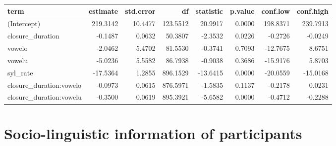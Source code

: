 \documentclass[preprint]{JASAnew}
\begin{document}
\begin{tabular}{lrrrrrrr}
\toprule
term & estimate & std.error & df & statistic & p.value & conf.low & conf.high\\
\midrule
(Intercept) & 219.3142 & 10.4477 & 123.5512 & 20.9917 & 0.0000 & 198.8371 & 239.7913\\
closure\_duration & -0.1487 & 0.0632 & 50.3807 & -2.3532 & 0.0226 & -0.2726 & -0.0249\\
vowelo & -2.0462 & 5.4702 & 81.5530 & -0.3741 & 0.7093 & -12.7675 & 8.6751\\
vowelu & -5.0236 & 5.5582 & 86.7938 & -0.9038 & 0.3686 & -15.9176 & 5.8703\\
syl\_rate & -17.5364 & 1.2855 & 896.1529 & -13.6415 & 0.0000 & -20.0559 & -15.0168\\
\addlinespace
closure\_duration:vowelo & -0.0973 & 0.0615 & 876.5971 & -1.5835 & 0.1137 & -0.2178 & 0.0231\\
closure\_duration:vowelu & -0.3500 & 0.0619 & 895.3921 & -5.6582 & 0.0000 & -0.4712 & -0.2288\\
\bottomrule
\end{tabular}
\normalsize

\hypertarget{socio-linguistic-information-of-participants}{%
\section{Socio-linguistic information of
participants}\label{socio-linguistic-information-of-participants}}

\label{a:socioling}
\end{document}
